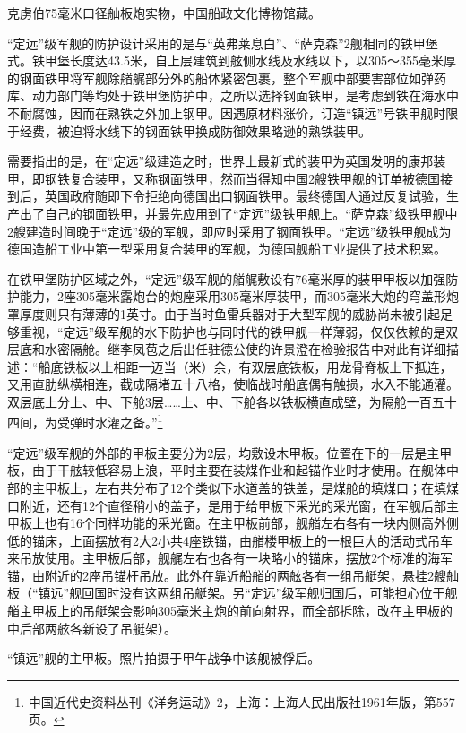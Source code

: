 \documentclass[12pt,UTF8]{ctexbook}
\begin{document}
克虏伯75毫米口径舢板炮实物，中国船政文化博物馆藏。

“定远”级军舰的防护设计采用的是与“英弗莱息白”、“萨克森”2舰相同的铁甲堡式。铁甲堡长度达43.5米，自上层建筑到舷侧水线及水线以下，以305～355毫米厚的钢面铁甲将军舰除艏艉部分外的船体紧密包裹，整个军舰中部要害部位如弹药库、动力部门等均处于铁甲堡防护中，之所以选择钢面铁甲，是考虑到铁在海水中不耐腐蚀，因而在熟铁之外加上钢甲。因遇原材料涨价，订造“镇远”号铁甲舰时限于经费，被迫将水线下的钢面铁甲换成防御效果略逊的熟铁装甲。

需要指出的是，在“定远”级建造之时，世界上最新式的装甲为英国发明的康邦装甲，即钢铁复合装甲，又称钢面铁甲，然而当得知中国2艘铁甲舰的订单被德国接到后，英国政府随即下令拒绝向德国出口钢面铁甲。最终德国人通过反复试验，生产出了自己的钢面铁甲，并最先应用到了“定远”级铁甲舰上。“萨克森”级铁甲舰中2艘建造时间晚于“定远”级的军舰，即应时采用了钢面铁甲。“定远”级铁甲舰成为德国造船工业中第一型采用复合装甲的军舰，为德国舰船工业提供了技术积累。

在铁甲堡防护区域之外，“定远”级军舰的艏艉敷设有76毫米厚的装甲甲板以加强防护能力，2座305毫米露炮台的炮座采用305毫米厚装甲，而305毫米大炮的穹盖形炮罩厚度则只有薄薄的1英寸。由于当时鱼雷兵器对于大型军舰的威胁尚未被引起足够重视，“定远”级军舰的水下防护也与同时代的铁甲舰一样薄弱，仅仅依赖的是双层底和水密隔舱。继李凤苞之后出任驻德公使的许景澄在检验报告中对此有详细描述：“船底铁板以上相距一迈当（米）余，有双层底铁板，用龙骨脊板上下抵连，又用直肋纵横相连，截成隔堵五十八格，使临战时船底偶有触损，水入不能通灌。双层底上分上、中、下舱3层……上、中、下舱各以铁板横直成壁，为隔舱一百五十四间，为受弹时水灌之备。”\footnote{中国近代史资料丛刊《洋务运动》2，上海：上海人民出版社1961年版，第557页。}

“定远”级军舰的外部的甲板主要分为2层，均敷设木甲板。位置在下的一层是主甲板，由于干舷较低容易上浪，平时主要在装煤作业和起锚作业时才使用。在舰体中部的主甲板上，左右共分布了12个类似下水道盖的铁盖，是煤舱的填煤口；在填煤口附近，还有12个直径稍小的盖子，是用于给甲板下采光的采光窗，在军舰后部主甲板上也有16个同样功能的采光窗。在主甲板前部，舰艏左右各有一块内侧高外侧低的锚床，上面摆放有2大2小共4座铁锚，由艏楼甲板上的一根巨大的活动式吊车来吊放使用。主甲板后部，舰艉左右也各有一块略小的锚床，摆放2个标准的海军锚，由附近的2座吊锚杆吊放。此外在靠近船艏的两舷各有一组吊艇架，悬挂2艘舢板（“镇远”舰回国时没有这两组吊艇架。另“定远”级军舰归国后，可能担心位于舰艏主甲板上的吊艇架会影响305毫米主炮的前向射界，而全部拆除，改在主甲板的中后部两舷各新设了吊艇架）。

“镇远”舰的主甲板。照片拍摄于甲午战争中该舰被俘后。
\end{document}

